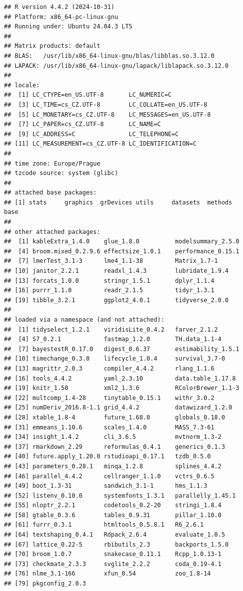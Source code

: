 \documentclass[
  10pt,
]{article}
\begin{document}
\begin{verbatim}
## R version 4.4.2 (2024-10-31)
## Platform: x86_64-pc-linux-gnu
## Running under: Ubuntu 24.04.3 LTS
## 
## Matrix products: default
## BLAS:   /usr/lib/x86_64-linux-gnu/blas/libblas.so.3.12.0 
## LAPACK: /usr/lib/x86_64-linux-gnu/lapack/liblapack.so.3.12.0
## 
## locale:
##  [1] LC_CTYPE=en_US.UTF-8       LC_NUMERIC=C              
##  [3] LC_TIME=cs_CZ.UTF-8        LC_COLLATE=en_US.UTF-8    
##  [5] LC_MONETARY=cs_CZ.UTF-8    LC_MESSAGES=en_US.UTF-8   
##  [7] LC_PAPER=cs_CZ.UTF-8       LC_NAME=C                 
##  [9] LC_ADDRESS=C               LC_TELEPHONE=C            
## [11] LC_MEASUREMENT=cs_CZ.UTF-8 LC_IDENTIFICATION=C       
## 
## time zone: Europe/Prague
## tzcode source: system (glibc)
## 
## attached base packages:
## [1] stats     graphics  grDevices utils     datasets  methods   base     
## 
## other attached packages:
##  [1] kableExtra_1.4.0    glue_1.8.0          modelsummary_2.5.0 
##  [4] broom.mixed_0.2.9.6 effectsize_1.0.1    performance_0.15.1 
##  [7] lmerTest_3.1-3      lme4_1.1-38         Matrix_1.7-1       
## [10] janitor_2.2.1       readxl_1.4.3        lubridate_1.9.4    
## [13] forcats_1.0.0       stringr_1.5.1       dplyr_1.1.4        
## [16] purrr_1.1.0         readr_2.1.5         tidyr_1.3.1        
## [19] tibble_3.2.1        ggplot2_4.0.1       tidyverse_2.0.0    
## 
## loaded via a namespace (and not attached):
##  [1] tidyselect_1.2.1    viridisLite_0.4.2   farver_2.1.2       
##  [4] S7_0.2.1            fastmap_1.2.0       TH.data_1.1-4      
##  [7] bayestestR_0.17.0   digest_0.6.37       estimability_1.5.1 
## [10] timechange_0.3.0    lifecycle_1.0.4     survival_3.7-0     
## [13] magrittr_2.0.3      compiler_4.4.2      rlang_1.1.6        
## [16] tools_4.4.2         yaml_2.3.10         data.table_1.17.8  
## [19] knitr_1.50          xml2_1.3.6          RColorBrewer_1.1-3 
## [22] multcomp_1.4-28     tinytable_0.15.1    withr_3.0.2        
## [25] numDeriv_2016.8-1.1 grid_4.4.2          datawizard_1.2.0   
## [28] xtable_1.8-4        future_1.68.0       globals_0.18.0     
## [31] emmeans_1.10.6      scales_1.4.0        MASS_7.3-61        
## [34] insight_1.4.2       cli_3.6.5           mvtnorm_1.3-2      
## [37] rmarkdown_2.29      reformulas_0.4.1    generics_0.1.3     
## [40] future.apply_1.20.0 rstudioapi_0.17.1   tzdb_0.5.0         
## [43] parameters_0.28.1   minqa_1.2.8         splines_4.4.2      
## [46] parallel_4.4.2      cellranger_1.1.0    vctrs_0.6.5        
## [49] boot_1.3-31         sandwich_3.1-1      hms_1.1.3          
## [52] listenv_0.10.0      systemfonts_1.3.1   parallelly_1.45.1  
## [55] nloptr_2.2.1        codetools_0.2-20    stringi_1.8.4      
## [58] gtable_0.3.6        tables_0.9.31       pillar_1.10.0      
## [61] furrr_0.3.1         htmltools_0.5.8.1   R6_2.6.1           
## [64] textshaping_0.4.1   Rdpack_2.6.4        evaluate_1.0.5     
## [67] lattice_0.22-5      rbibutils_2.3       backports_1.5.0    
## [70] broom_1.0.7         snakecase_0.11.1    Rcpp_1.0.13-1      
## [73] checkmate_2.3.3     svglite_2.2.2       coda_0.19-4.1      
## [76] nlme_3.1-166        xfun_0.54           zoo_1.8-14         
## [79] pkgconfig_2.0.3
\end{verbatim}
\end{document}

